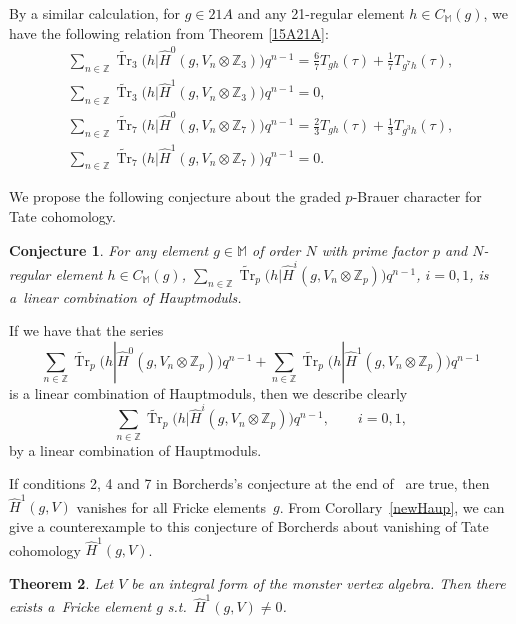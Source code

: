 \documentclass[pdftex]{sigma}%
\numberwithin{equation}{section}
\newtheorem{Theorem}{Theorem}[section]
\newtheorem{Conjecture}[Theorem]{Conjecture}
\begin{document}
 By a similar calculation, for $g\in 21A$ and any 21-regular element $h\in C_{\mathbb{M}}(g)$, we have the following relation from Theorem \ref{15A21A}:
\begin{gather*}
\sum_{n\in \mathbb{Z}}\widetilde{\operatorname{Tr}}_3\big(h|\hat{H}^0(g,V_n\otimes \mathbb{Z}_3)\big)q^{n-1}= \frac{6}{7}T_{gh}(\tau)+\frac{1}{7}T_{g^7h}(\tau),\\
\sum_{n\in \mathbb{Z}}\widetilde{\operatorname{Tr}}_3\big(h|\hat{H}^1(g,V_n\otimes \mathbb{Z}_3)\big)q^{n-1}=0,\\
\sum_{n\in \mathbb{Z}}\widetilde{\operatorname{Tr}}_7\big(h|\hat{H}^0(g,V_n\otimes \mathbb{Z}_7)\big)q^{n-1}= \frac{2}{3}T_{gh}(\tau)+\frac{1}{3}T_{g^3h}(\tau),\\
\sum_{n\in \mathbb{Z}}\widetilde{\operatorname{Tr}}_7\big(h|\hat{H}^1(g,V_n\otimes \mathbb{Z}_7)\big)q^{n-1}= 0.
\end{gather*}

We propose the following conjecture about the graded $p$-Brauer character for Tate co\-ho\-mo\-logy.

\begin{Conjecture}
 For any element $g \in \mathbb{M}$ of order $N$ with prime factor $p$ and $N$-regular element $h \in C_{\mathbb{M}}(g)$, $\sum_{n\in \mathbb{Z}}\widetilde{\operatorname{Tr}}_p\big(h|\hat{H}^i(g,V_n\otimes \mathbb{Z}_p)\big)q^{n-1}$, $i=0,1$, is a~linear combination of Hauptmoduls.
\end{Conjecture}

If we have that the series
\[
\sum_{n\in \mathbb{Z}}\widetilde{\operatorname{Tr}}_p\big(h|\hat{H}^0(g,V_n\otimes \mathbb{Z}_p)\big)q^{n-1}+\sum_{n\in \mathbb{Z}}\widetilde{\operatorname{Tr}}_p\big(h|\hat{H}^1(g,V_n\otimes \mathbb{Z}_p)\big)q^{n-1}
\] is a linear combination of Hauptmoduls, then we describe clearly
\[
\sum_{n\in \mathbb{Z}}\widetilde{\operatorname{Tr}}_p\big(h|\hat{H}^i(g,V_n\otimes \mathbb{Z}_p)\big)q^{n-1}, \qquad i=0,1,
\]
by a linear combination of Hauptmoduls.

If conditions 2, 4 and 7 in Borcherds's conjecture at the end of~\cite{B98} are true, then $\hat{H}^1(g,V)$ vanishes for all Fricke elements~$g$.
From Corollary~\ref{newHaup}, we can give a counterexample to this conjecture of Borcherds about vanishing of Tate cohomology $\hat{H}^1(g,V)$.

\begin{Theorem}
Let $V$ be an integral form of the monster vertex algebra. Then there exists a~Fricke element $g$ s.t.\ $\hat{H}^1(g,V)\neq 0$.
\end{Theorem}
\end{document}
